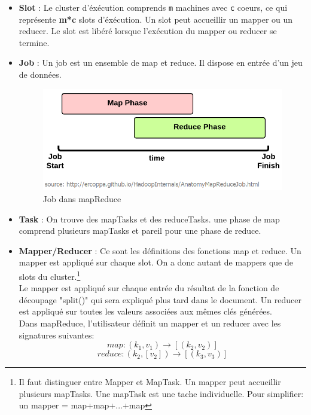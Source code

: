 \begin{itemize}
\item {\bf Slot} : Le cluster d'éxécution comprends {\tt m} machines avec {\tt c} coeurs, ce qui représente {\bf m*c} slots d'éxécution.
Un slot peut accueillir un mapper ou un reducer. Le slot est libéré lorsque l'exécution du mapper ou reducer se termine.
\item {\bf Job}  : Un job est un ensemble de map et reduce. Il dispose en entrée d'un jeu de données.
\begin{figure}[H]
  \centering
    \includegraphics[scale=0.9]{images/job_timeline.png}
        \caption{Job dans mapReduce}
\end{figure}
\item {\bf Task} : On trouve des mapTasks et des reduceTasks. une phase de map comprend plusieurs mapTasks et pareil pour une phase de reduce.

\item {\bf Mapper/Reducer} : Ce sont les définitions des fonctions map et reduce. Un mapper est appliqué sur chaque slot. On a donc autant de mappers que de slots du cluster.\footnote{Il faut distinguer entre Mapper et MapTask. Un mapper peut accueillir plusieurs mapTasks. Une mapTask est une tache individuelle. Pour simplifier: un mapper = map+map+...+map}\\
Le mapper est appliqué sur chaque entrée du résultat de la fonction de découpage "split()" qui sera expliqué plus tard dans le document.  
Un reducer est appliqué sur toutes les valeurs associées aux mêmes clés générées.\\

Dans mapReduce, l'utilisateur définit un mapper et un reducer avec les signatures suivantes\cite{mapReduceTextProcessing}:
\[	map: (k_1,v_1) \rightarrow [(k_2,v_2)] \]
\[  reduce:(k_2,[v_2]) \rightarrow [(k_3,v_3)] \]
\end{itemize}

